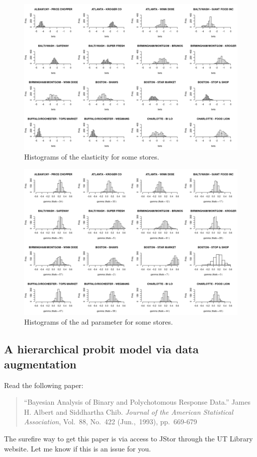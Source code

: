 \documentclass{article}
\begin{document}
\begin{enumerate}
\begin{figure}[h]
\includegraphics[width=\textwidth]{beta.jpeg}
\caption{Histograms of the elasticity for some stores.}
\end{figure}


\begin{figure}[h]
\includegraphics[width=\textwidth]{gamma.jpeg}
\caption{Histograms of the ad parameter for some stores.}
\end{figure}


\end{enumerate}

\subsection{A hierarchical probit model via data augmentation}

Read the following paper:
\begin{quotation}
``Bayesian Analysis of Binary and Polychotomous Response Data.''  James H. Albert and Siddhartha Chib.  \textit{Journal of the American Statistical Association}, Vol.~88, No.~422 (Jun.,~1993), pp.~669-679
\end{quotation}
The surefire way to get this paper is via access to JStor through the UT Library website.  Let me know if this is an issue for you.
\end{document}
